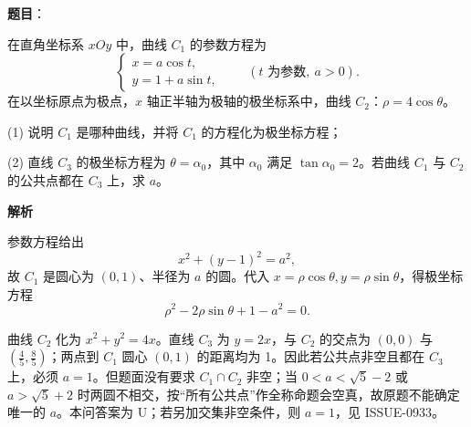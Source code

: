 \begin{answer}

\textbf{题目}：

在直角坐标系 $xOy$ 中，曲线 $C_1$ 的参数方程为
\nopagebreak[4]
\[
   \begin{cases}
   x=a\cos t,\\
   y=1+a\sin t,
   \end{cases}\qquad (t\text{ 为参数},\ a>0).
\]
   在以坐标原点为极点，$x$ 轴正半轴为极轴的极坐标系中，曲线 $C_2$：$\rho=4\cos\theta$。

   (1) 说明 $C_1$ 是哪种曲线，并将 $C_1$ 的方程化为极坐标方程；

   (2) 直线 $C_3$ 的极坐标方程为 $\theta=\alpha_0$，其中 $\alpha_0$ 满足 $\tan\alpha_0=2$。若曲线 $C_1$ 与 $C_2$ 的公共点都在 $C_3$ 上，求 $a$。

\textbf{解析}


参数方程给出
\nopagebreak[4]
\[
x^2+(y-1)^2=a^2,
\]
故 \(C_1\) 是圆心为 \((0,1)\)、半径为 \(a\) 的圆。代入 \(x=\rho\cos\theta,y=\rho\sin\theta\)，得极坐标方程
\nopagebreak[4]
\[
\rho^2-2\rho\sin\theta+1-a^2=0.
\]


曲线 \(C_2\) 化为 \(x^2+y^2=4x\)。直线 \(C_3\) 为 \(y=2x\)，与 \(C_2\) 的交点为 \((0,0)\) 与 \((\frac45,\frac85)\)；两点到 \(C_1\) 圆心 \((0,1)\) 的距离均为 1。因此若公共点非空且都在 \(C_3\) 上，必须 \(a=1\)。但题面没有要求 \(C_1\cap C_2\) 非空；当 \(0<a<\sqrt5-2\) 或 \(a>\sqrt5+2\) 时两圆不相交，按“所有公共点”作全称命题会空真，故原题不能确定唯一的 \(a\)。本问答案为 U；若另加交集非空条件，则 \(a=1\)，见 ISSUE-0933。



\end{answer}
